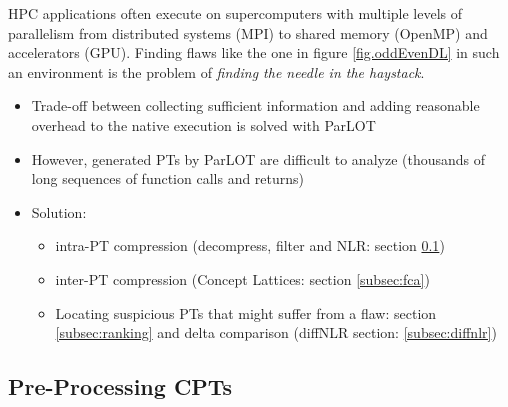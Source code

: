 HPC applications often execute on supercomputers with multiple levels of parallelism from distributed systems (MPI) to shared memory (OpenMP) and accelerators (GPU). Finding flaws like the one in figure \ref{fig.oddEvenDL} in such an environment is the problem of \textit{finding the needle in the haystack}.
%
\begin{itemize}
\item Trade-off between collecting sufficient information and adding reasonable overhead to the native execution is solved with ParLOT
\item However, generated PTs by ParLOT are difficult to analyze (thousands of long sequences of function calls and returns)
\item Solution:
	\begin{itemize}
	\item intra-PT compression (decompress, filter and NLR: section \ref{subsec:nlr})
	\item inter-PT compression (Concept Lattices: section \ref{subsec:fca})
	\item Locating suspicious PTs that might suffer from a flaw: section \ref{subsec:ranking} and delta comparison (diffNLR section: \ref{subsec:diffnlr})
	\end{itemize}
\end{itemize}


\clearpage

\subsection{Pre-Processing CPTs}
\label{subsec:nlr}

